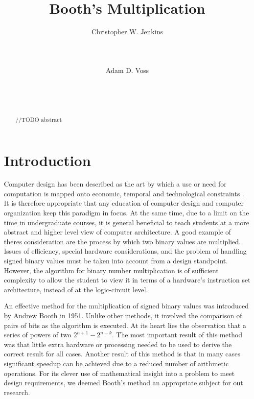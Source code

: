 \documentclass{acm_proc_article-sp}
\begin{document}
\title{Booth's Multiplication}

\author{
    \alignauthor
    Christopher W. Jenkins\\
       \\
       \\
       \\
    \alignauthor
    Adam D. Voss\\
       \\
       \\
       \\
}

\maketitle

\begin{abstract}
//TODO abstract
\end{abstract}

\section{Introduction}
Computer design has been described as the art by which a use or need for computation is mapped onto economic, temporal and technological constraints \cite{ibm370}.  It is therefore appropriate that any education of computer design and computer organization keep this paradigm in focus.  At the same time, due to a limit on the time in undergraduate courses, it is general beneficial to teach students at a more abstract and higher level view of computer architecture.  A good example of theres consideration are the process by which two binary values are multiplied.  Issues of efficiency, special hardware considerations, and the problem of handling signed binary values must be taken into account from a design standpoint.  However, the algorithm for binary number multiplication is of sufficient complexity to allow the student to view it in terms of a hardware's instruction set architecture, instead of at the logic-circuit level.

An effective method for the multiplication of signed binary values was introduced by Andrew Booth in 1951. Unlike other methods, it involved the comparison of pairs of bits as the algorithm is executed.  At its heart lies the observation that a series of powers of two $2^{n+1} - 2^{n-k}$. The most important result of this method was that little extra hardware or processing needed to be used to derive the correct result for all cases\cite{needsCitation}. Another result of this method is that in many cases significant speedup can be achieved due to a reduced number of arithmetic operations. For its clever use of mathematical insight into a problem to meet design requirements, we deemed Booth's method an appropriate subject for out research\cite{booth}. %
\end{document}
